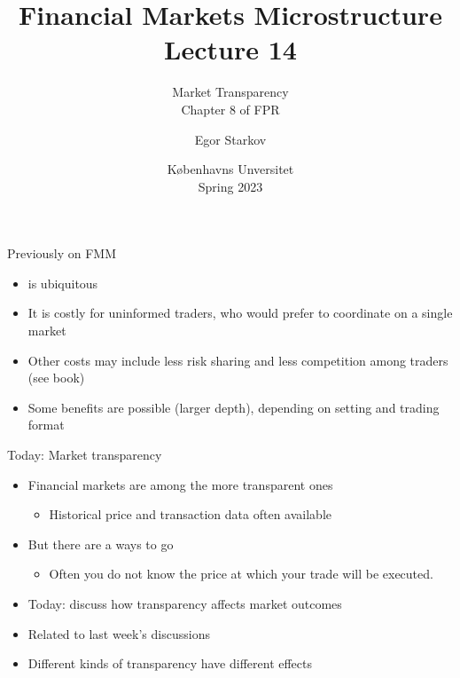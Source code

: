 \documentclass[english,10pt
,aspectratio=169
]{beamer}
\title{Financial Markets Microstructure \\ Lecture 14}
\subtitle{Market Transparency\\
	Chapter 8 of FPR}
\author{Egor Starkov}
\date{K{\o}benhavns Unversitet \\
	Spring 2023}
\begin{document}
\frame[plain]{\titlepage}


\begin{frame}{Previously on FMM}
	\begin{itemize}
		\item {} is ubiquitous 
		\item It is costly for uninformed traders, who would prefer to coordinate on a single market
		\item Other costs may include less risk sharing and less competition among traders (see book)
		\item Some benefits are possible (larger depth), depending on setting and trading format
	\end{itemize}
\end{frame}


\begin{frame}{Today: Market transparency}
	\begin{itemize}
		\item Financial markets are among the more transparent ones
		\begin{itemize}
			\item Historical price and transaction data often available
		\end{itemize}
		\item But there are a ways to go
		\begin{itemize}
			\item Often you do not know the price at which your trade will be executed.
		\end{itemize}
		\bigskip\pause
		\item Today: discuss how transparency affects market outcomes
		\item Related to last week's discussions
		\item Different kinds of transparency have different effects
	\end{itemize}
\end{frame}
\end{document}
